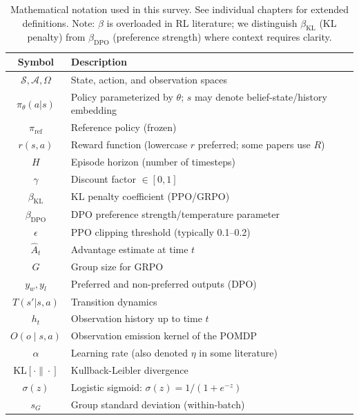 \documentclass[12pt,a4paper]{report}
\theoremstyle{definition}
\begin{document}
\begin{table}[h]
\centering
\begin{tabular}{@{}cl@{}}
\toprule
\textbf{Symbol} & \textbf{Description} \\
\midrule
$\mathcal{S}, \mathcal{A}, \Omega$ & State, action, and observation spaces \\
$\pi_\theta(a|s)$ & Policy parameterized by $\theta$; $s$ may denote belief-state/history embedding \\
$\pi_{\text{ref}}$ & Reference policy (frozen) \\
$r(s,a)$ & Reward function (lowercase $r$ preferred; some papers use $R$) \\
$H$ & Episode horizon (number of timesteps) \\
$\gamma$ & Discount factor $\in [0,1]$ \\
$\beta_{\text{KL}}$ & KL penalty coefficient (PPO/GRPO) \\
$\beta_{\text{DPO}}$ & DPO preference strength/temperature parameter \\
$\epsilon$ & PPO clipping threshold (typically 0.1--0.2) \\
$\hat{A}_t$ & Advantage estimate at time $t$ \\
$G$ & Group size for GRPO \\
$y_w, y_l$ & Preferred and non-preferred outputs (DPO) \\
$T(s'|s,a)$ & Transition dynamics \\
$h_t$ & Observation history up to time $t$ \\
$O(o \mid s, a)$ & Observation emission kernel of the POMDP \\
$\alpha$ & Learning rate (also denoted $\eta$ in some literature) \\
$\text{KL}[\cdot\|\cdot]$ & Kullback-Leibler divergence \\
$\sigma(z)$ & Logistic sigmoid: $\sigma(z) = 1/(1+e^{-z})$ \\
$s_G$ & Group standard deviation (within-batch) \\
\bottomrule
\end{tabular}
\caption{Mathematical notation used in this survey. See individual chapters for extended definitions. Note: $\beta$ is overloaded in RL literature; we distinguish $\beta_{\text{KL}}$ (KL penalty) from $\beta_{\text{DPO}}$ (preference strength) where context requires clarity.}
\label{tab:notation}
\end{table}

\clearpage
{}
\end{document}
